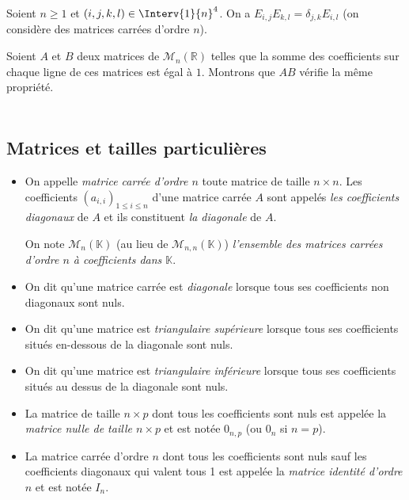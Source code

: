 \documentclass[a4paper,10pt]{report}
\begin{document}
\medskip


\begin{prop}  Soient $n \geq 1$ et $(i,j,k,l) \in \Interv{1}{n}^4$. On a $E_{i,j} E_{k,l} = \delta_{j,k} E_{i,l}$ (on considère des matrices carrées d'ordre $n$).
\end{prop}

\begin{ex} Soient $A$ et $B$ deux matrices de $\mathcal{M}_n(\mathbb{R})$ telles que la somme des coefficients sur chaque ligne de ces matrices est égal à $1$. Montrons que $AB$ vérifie la même propriété.



\end{ex}

\newpage

$\phantom{test}$

\vspace{4cm}
\subsection{Matrices et tailles particulières}

\begin{defin}
\begin{itemize}
\item On appelle \textit{matrice carrée d'ordre $n$} toute matrice de taille $n \times n$. Les coefficients $(a_{i,i})_{1 \leq i \leq n}$ d'une matrice carrée $A$ sont appelés \textit{les coefficients diagonaux} de $A$ et ils constituent \textit{la diagonale} de $A$.

\noindent On note $\mathcal{M}_n(\mathbb{K})$ (au lieu de $\mathcal{M}_{n,n}( \mathbb{K})$) \textit{l'ensemble des matrices carrées d'ordre $n$ à coefficients dans $\mathbb{K}$}.
\item On dit qu'une matrice carrée est \textit{diagonale} lorsque tous ses coefficients non diagonaux sont nuls.
\item On dit qu'une matrice est \textit{triangulaire supérieure} lorsque tous ses coefficients situés en-dessous de la diagonale sont nuls.
\item On dit qu'une matrice est \textit{triangulaire inférieure} lorsque tous ses coefficients situés au dessus de la diagonale sont nuls.
\end{itemize}
\end{defin}



\begin{defin}
\begin{itemize}
\item La matrice de taille $n \times p$ dont tous les coefficients sont nuls est appelée la \textit{matrice nulle de taille $n \times p$} et est notée $0_{n,p}$ (ou $0_{n}$ si $n=p$).
\item La matrice carrée d'ordre $n$ dont tous les coefficients sont nuls sauf les coefficients diagonaux qui valent tous 1 est appelée la \textit{matrice identité d'ordre $n$} et est notée $I_n$.
\end{itemize}
\end{defin}
\end{document}
